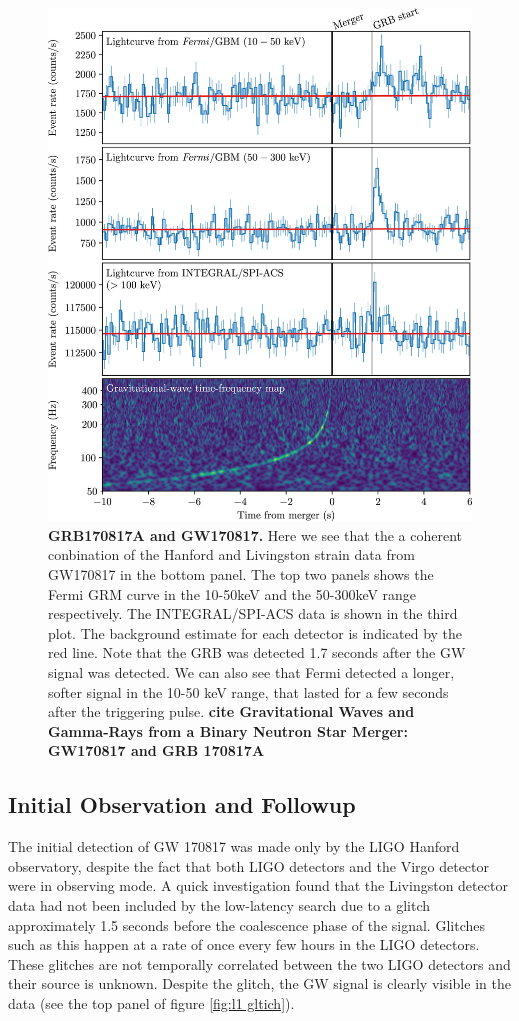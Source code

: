 \documentclass[11pt]{cuthesis}
\begin{document}
\begin{figure} %
\begin{center}
\includegraphics[width=0.8\linewidth]{grb-gw-170817.jpg}
\end{center}
\caption{\textbf{GRB170817A and GW170817.} Here we see that the a coherent conbination of the Hanford and Livingston strain data from GW170817 in the bottom panel. The top two panels shows the Fermi GRM curve in the 10-50keV and the 50-300keV range respectively. The INTEGRAL/SPI-ACS data is shown in the third plot. The background estimate for each detector is indicated by the red line. Note that the GRB was detected 1.7 seconds after the GW signal was detected. We can also see that Fermi detected a longer, softer signal in the 10-50 keV range, that lasted for a few seconds after the triggering pulse. \textbf{cite Gravitational Waves and Gamma-Rays from a Binary Neutron Star Merger: GW170817 and GRB 170817A} }
\label{fig:grb gw 170817}
\end{figure}

\subsection{Initial Observation and Followup}
The initial detection of GW 170817 was made only by the LIGO Hanford observatory, despite the fact that both LIGO detectors and the Virgo detector were in observing mode. A quick investigation found that the Livingston detector data had not been included by the low-latency search due to a glitch approximately 1.5 seconds before the coalescence phase of the signal. Glitches such as this happen at a rate of once every few hours in the LIGO detectors. These glitches are not temporally correlated between the two LIGO detectors and their source is unknown. Despite the glitch, the GW signal is clearly visible in the data (see the top panel of figure \ref{fig:l1 gltich}). 
\end{document}
